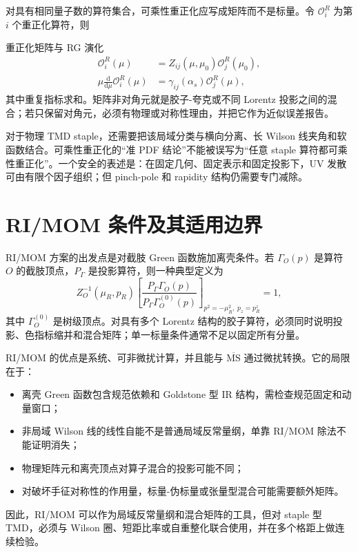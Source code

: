 \documentclass[UTF8,12pt,a4paper,twoside,openany]{ctexbook}
\newcommand{\MSbar}{\overline{\mathrm{MS}}}
\newcommand{\dd}{\mathrm{d}}
\begin{document}
对具有相同量子数的算符集合，可乘性重正化应写成矩阵而不是标量。令 \(\mathcal O_i^{R}\) 为第 \(i\) 个重正化算符，则
\begin{keyformula}{重正化矩阵与 RG 演化}
\begin{align}
  \mathcal O_i^{R}(\mu)
  &=Z_{ij}(\mu,\mu_0)\mathcal O_j^{R}(\mu_0),
  \label{eq:renormmatrix}\\
  \mu\frac{\dd}{\dd\mu}\mathcal O_i^{R}(\mu)
  &=\gamma_{ij}(\alpha_s)\mathcal O_j^{R}(\mu),
  \label{eq:renormrge}
\end{align}
其中重复指标求和。矩阵非对角元就是胶子-夸克或不同 Lorentz 投影之间的混合；若只保留对角元，必须有物理或对称性理由，并把它作为近似误差报告。
\end{keyformula}

对于物理 TMD staple，还需要把该局域分类与横向分离、长 Wilson 线夹角和软函数结合。可乘性重正化的“准 PDF 结论”不能被误写为“任意 staple 算符都可乘性重正化”。一个安全的表述是：在固定几何、固定表示和固定投影下，UV 发散可由有限个因子组织；但 pinch-pole 和 rapidity 结构仍需要专门减除。

\section{RI/MOM 条件及其适用边界}

RI/MOM 方案的出发点是对截肢 Green 函数施加离壳条件。若 \(\Gamma_O(p)\) 是算符 \(O\) 的截肢顶点，\(P_\Gamma\) 是投影算符，则一种典型定义为
\begin{equation}
  Z_O^{-1}(\mu_R,p_R)
  \left[
  \frac{P_\Gamma\Gamma_O(p)}
  {P_\Gamma\Gamma_O^{(0)}(p)}
  \right]_{p^2=-\mu_R^2,\;p_z=p_R^z}
  =1,
  \label{eq:ri-momcondition}
\end{equation}
其中 \(\Gamma_O^{(0)}\) 是树级顶点。对具有多个 Lorentz 结构的胶子算符，必须同时说明投影、色指标缩并和混合矩阵；单一标量条件通常不足以固定所有分量。

RI/MOM 的优点是系统、可非微扰计算，并且能与 \(\MSbar\) 通过微扰转换。它的局限在于：
\begin{itemize}
  \item 离壳 Green 函数包含规范依赖和 Goldstone 型 IR 结构，需检查规范固定和动量窗口；
  \item 非局域 Wilson 线的线性自能不是普通局域反常量纲，单靠 RI/MOM 除法不能证明消失；
  \item 物理矩阵元和离壳顶点对算子混合的投影可能不同；
  \item 对破坏手征对称性的作用量，标量-伪标量或张量型混合可能需要额外矩阵。
\end{itemize}
因此，RI/MOM 可以作为局域反常量纲和混合矩阵的工具，但对 staple 型 TMD，必须与 Wilson 圈、短距比率或自重整化联合使用，并在多个格距上做连续检验\cite{Huo2021,Zhang2022TMD}。
\end{document}
